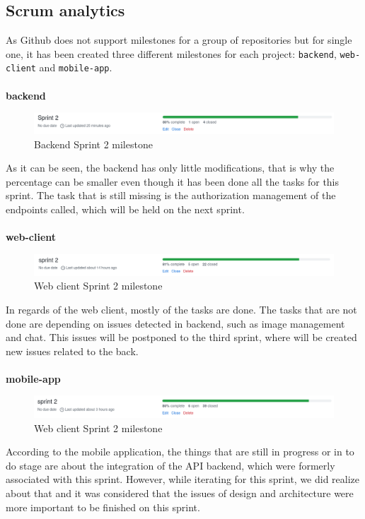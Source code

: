\documentclass[./main.tex]{subfiles}
\begin{document}
\subsection{Scrum analytics}
As Github does not support milestones for a group of repositories but for single one, it has been created three different milestones for each project: \texttt{backend}, \texttt{web-client} and \texttt{mobile-app}.
\\
\\
\textbf{backend}
\begin{figure}[H]
	\centering
	\includegraphics[width=15cm]{img/sprint2-backend.png}
	\caption{Backend Sprint 2 milestone}
\end{figure}
As it can be seen, the backend has only little modifications, that is why the percentage can be smaller even though it has been done all the tasks for this sprint. The task that is still missing is the authorization management of the endpoints called, which will be held on the next sprint.
\\
\\
\textbf{web-client}
\begin{figure}[H]
	\centering
	\includegraphics[width=15cm]{img/sprint2-web.png}
	\caption{Web client Sprint 2 milestone}
\end{figure}
In regards of the web client, mostly of the tasks are done. The tasks that are not done are depending on issues detected in backend, such as image management and chat. This issues will be postponed to the third sprint, where will be created new issues related to the back.
\\\\
\textbf{mobile-app}
\begin{figure}[H]
	\centering
	\includegraphics[width=15cm]{img/sprint2-mobile.png}
	\caption{Web client Sprint 2 milestone}
\end{figure}
According to the mobile application, the things that are still in progress or in to do stage are about the integration of the API backend, which were formerly associated with this sprint. However, while iterating for this sprint, we did realize about that and it was considered that the issues of design and architecture were more important to be finished on this sprint.
\end{document}
